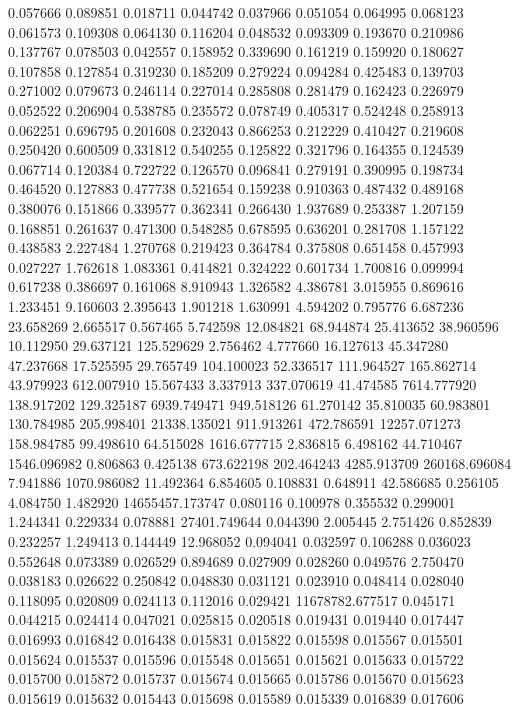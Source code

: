 0.057666
0.089851
0.018711
0.044742
0.037966
0.051054
0.064995
0.068123
0.061573
0.109308
0.064130
0.116204
0.048532
0.093309
0.193670
0.210986
0.137767
0.078503
0.042557
0.158952
0.339690
0.161219
0.159920
0.180627
0.107858
0.127854
0.319230
0.185209
0.279224
0.094284
0.425483
0.139703
0.271002
0.079673
0.246114
0.227014
0.285808
0.281479
0.162423
0.226979
0.052522
0.206904
0.538785
0.235572
0.078749
0.405317
0.524248
0.258913
0.062251
0.696795
0.201608
0.232043
0.866253
0.212229
0.410427
0.219608
0.250420
0.600509
0.331812
0.540255
0.125822
0.321796
0.164355
0.124539
0.067714
0.120384
0.722722
0.126570
0.096841
0.279191
0.390995
0.198734
0.464520
0.127883
0.477738
0.521654
0.159238
0.910363
0.487432
0.489168
0.380076
0.151866
0.339577
0.362341
0.266430
1.937689
0.253387
1.207159
0.168851
0.261637
0.471300
0.548285
0.678595
0.636201
0.281708
1.157122
0.438583
2.227484
1.270768
0.219423
0.364784
0.375808
0.651458
0.457993
0.027227
1.762618
1.083361
0.414821
0.324222
0.601734
1.700816
0.099994
0.617238
0.386697
0.161068
8.910943
1.326582
4.386781
3.015955
0.869616
1.233451
9.160603
2.395643
1.901218
1.630991
4.594202
0.795776
6.687236
23.658269
2.665517
0.567465
5.742598
12.084821
68.944874
25.413652
38.960596
10.112950
29.637121
125.529629
2.756462
4.777660
16.127613
45.347280
47.237668
17.525595
29.765749
104.100023
52.336517
111.964527
165.862714
43.979923
612.007910
15.567433
3.337913
337.070619
41.474585
7614.777920
138.917202
129.325187
6939.749471
949.518126
61.270142
35.810035
60.983801
130.784985
205.998401
21338.135021
911.913261
472.786591
12257.071273
158.984785
99.498610
64.515028
1616.677715
2.836815
6.498162
44.710467
1546.096982
0.806863
0.425138
673.622198
202.464243
4285.913709
260168.696084
7.941886
1070.986082
11.492364
6.854605
0.108831
0.648911
42.586685
0.256105
4.084750
1.482920
14655457.173747
0.080116
0.100978
0.355532
0.299001
1.244341
0.229334
0.078881
27401.749644
0.044390
2.005445
2.751426
0.852839
0.232257
1.249413
0.144449
12.968052
0.094041
0.032597
0.106288
0.036023
0.552648
0.073389
0.026529
0.894689
0.027909
0.028260
0.049576
2.750470
0.038183
0.026622
0.250842
0.048830
0.031121
0.023910
0.048414
0.028040
0.118095
0.020809
0.024113
0.112016
0.029421
11678782.677517
0.045171
0.044215
0.024414
0.047021
0.025815
0.020518
0.019431
0.019440
0.017447
0.016993
0.016842
0.016438
0.015831
0.015822
0.015598
0.015567
0.015501
0.015624
0.015537
0.015596
0.015548
0.015651
0.015621
0.015633
0.015722
0.015700
0.015872
0.015737
0.015674
0.015665
0.015786
0.015670
0.015623
0.015619
0.015632
0.015443
0.015698
0.015589
0.015339
0.016839
0.017606
